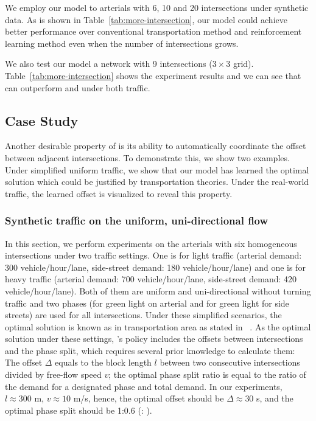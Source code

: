 We employ our model to arterials with 6, 10 and 20 intersections under synthetic data. As is shown in Table~\ref{tab:more-intersection},  our model could achieve better performance over conventional transportation method \Maxpressure and reinforcement learning method \LIT even when the number of intersections grows. 

We also test our model a network with 9 intersections ($3\times3$ grid). Table~\ref{tab:more-intersection} shows the experiment results and we can see that \PressLight can outperform \Maxpressure and \LIT under both traffic.

\subsection{Case Study}
Another desirable property of \PressLight is its ability to automatically coordinate the offset between adjacent intersections. To demonstrate this, we show two examples. Under simplified uniform traffic, we show that our model has learned the optimal solution which could be justified by transportation theories. Under the real-world traffic, the learned offset is visualized to reveal this property.

\subsubsection{Synthetic traffic on the uniform, uni-directional flow}

In this section, we perform experiments on the arterials with six homogeneous intersections under two traffic settings. One is for light traffic (arterial demand: 300 vehicle/hour/lane, side-street demand: 180 vehicle/hour/lane) and one is for heavy traffic (arterial demand: 700 vehicle/hour/lane, side-street demand: 420 vehicle/hour/lane). Both of them are uniform and uni-directional without turning traffic and two phases (\WE for green light on arterial and \SN for green light for side streets) are used for all intersections. Under these simplified scenarios, the optimal solution is known as \Greenwave in transportation area as stated in ~\cite{Roess2011t}. As the optimal solution under these settings, \Greenwave's policy includes the offsets between intersections and the phase split, which requires several prior knowledge to calculate them: The offset $\Delta$ equals to the block length $l$ between two consecutive intersections divided by free-flow speed $v$; the optimal phase split ratio is equal to the ratio of the demand for a designated phase and total demand. In our experiments, $l\approx 300$ m, $v\approx 10$ m/s, hence, the optimal offset should be $\Delta\approx 30$ s, and the optimal phase split should be 1:0.6 (\WE : \SN).

